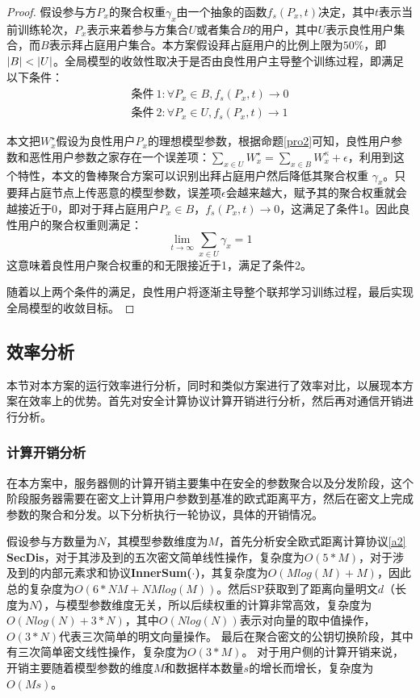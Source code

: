 \begin{proof}
	假设参与方$P_x$的聚合权重$\gamma_{x}$由一个抽象的函数$f_s(P_x,t)$决定，其中$t$表示当前训练轮次，$P_x$表示来着参与方集合$U$或者集合$B$的用户，其中$ U $表示良性用户集合，而$ B $表示拜占庭用户集合。本方案假设拜占庭用户的比例上限为$50\%$，即$\vert B\vert <\vert U\vert$。全局模型的收敛性取决于是否由良性用户主导整个训练过程，即满足以下条件：
	\begin{equation*}
		\begin{split}
			\mbox{条件}\ 1:{\forall}P_x \in B, f_s(P_x,t)\rightarrow 0 \\
			\mbox{条件}\ 2:{\forall}P_x \in U, f_s(P_x,t)\rightarrow 1
		\end{split}
	\end{equation*}
	
	本文把$W_x^{\star}$假设为良性用户$P_x$的理想模型参数，根据命题\ref{pro2}可知，良性用户参数和恶性用户参数之家存在一个误差项：$\sum_{x\in U}W_x^{\star}=   \sum_{x\in B}W_x^{\kappa} + \epsilon$，利用到这个特性，本文的鲁棒聚合方案可以识别出拜占庭用户然后降低其聚合权重 $\gamma_x$。只要拜占庭节点上传恶意的模型参数，误差项$\epsilon$会越来越大，赋予其的聚合权重就会越接近于0，即对于拜占庭用户$P_x \in B$，$f_s(P_x, t)\rightarrow 0$，这满足了条件1。因此良性用户的聚合权重则满足：
	$$
		\lim_{t \to \infty}\sum_{x \in U} \gamma_x = 1
	$$
	这意味着良性用户聚合权重的和无限接近于1，满足了条件2。
	
	随着以上两个条件的满足，良性用户将逐渐主导整个联邦学习训练过程，最后实现全局模型的收敛目标。
\end{proof}

\subsection{效率分析}
本节对本方案的运行效率进行分析，同时和类似方案进行了效率对比，以展现本方案在效率上的优势。首先对安全计算协议计算开销进行分析，然后再对通信开销进行分析。

\subsubsection{计算开销分析}
在本方案中，服务器侧的计算开销主要集中在安全的参数聚合以及分发阶段，这个阶段服务器需要在密文上计算用户参数到基准的欧式距离平方，然后在密文上完成参数的聚合和分发。以下分析执行一轮协议，具体的开销情况。

假设参与方数量为$N$，其模型参数维度为$M$，首先分析安全欧式距离计算协议\ref{a2} \textbf{SecDis}，对于其涉及到的五次密文简单线性操作，复杂度为$O(5*M)$，对于涉及到的内部元素求和协议\textbf{InnerSum($\cdot$)}，其复杂度为$O(Mlog(M) + M)$，因此总的复杂度为$O(6*NM+NMlog(M))$。然后SP获取到了距离向量明文$d$（长度为$N$），与模型参数维度无关，所以后续权重的计算非常高效，复杂度为$O(Nlog(N) + 3*N)$，其中$O(Nlog(N))$表示对向量的取中值操作，$O(3*N)$代表三次简单的明文向量操作。
最后在聚合密文的公钥切换阶段，其中有三次简单密文线性操作，复杂度为$ O(3*M) $。
对于用户侧的计算开销来说，开销主要随着模型参数的维度$M$和数据样本数量$s$的增长而增长，复杂度为$O(Ms)$。

